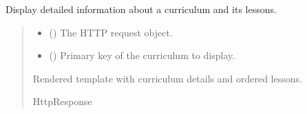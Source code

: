 \documentclass[letterpaper,10pt,english]{sphinxmanual}
\begin{document}
\begin{fulllineitems}
\label{\detokenize{courses:courses.views.curriculum_detail}}
\pysigstartsignatures
\pysiglinewithargsret
{}
{\sphinxparamcomma {}}
{}
\pysigstopsignatures
\sphinxAtStartPar
Display detailed information about a curriculum and its lessons.
\begin{quote}\begin{description}
\begin{itemize}
\item {} 
\sphinxAtStartPar
{} () \textendash{} The HTTP request object.

\item {} 
\sphinxAtStartPar
{} () \textendash{} Primary key of the curriculum to display.

\end{itemize}

\sphinxAtStartPar
Rendered template with curriculum details and ordered lessons.

\sphinxAtStartPar
HttpResponse

\end{description}\end{quote}

\end{fulllineitems}

\end{document}
